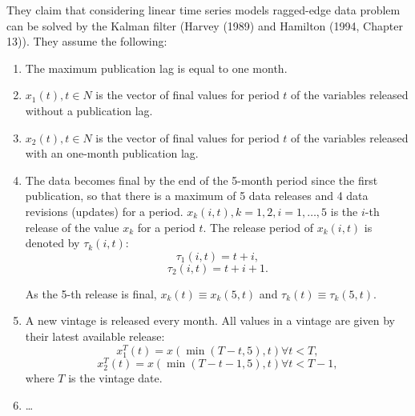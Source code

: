 \documentclass[8pt, a4paper, twocolumn, landscape]{extarticle}
\begin{document}
	They claim that considering linear time series models ragged-edge data problem can be solved by the Kalman filter (Harvey (1989) and Hamilton (1994, Chapter 13)). They assume the following:
	\begin{enumerate}
		\item The maximum publication lag is equal to one month.
		\item $x_1(t), t \in N$ is the vector of final values for period $t$ of the variables released without a publication lag.
		\item $x_2(t), t \in N$ is the vector of final values for period $t$ of the variables released with an one-month publication lag.
		\item The data becomes final by the end of the 5-month period since the first publication, so that there is a maximum of 5 data releases and 4 data revisions (updates) for a period. $x_k(i, t), k = 1, 2, i = 1, \dots, 5$ is the $i$-th release of the value $x_k$ for a period $t$. The release period of $x_k(i, t)$ is denoted by $\tau_k(i, t)$:
		\[
		\tau_1(i, t) = t + i,
		\]
		\[
		\tau_2(i, t) = t + i + 1.
		\]
		
		As the 5-th release is final, $x_k(t) \equiv x_k(5, t)$ and $\tau_k(t) \equiv \tau_k(5, t)$. 
		\item A new vintage is released every month. All values in a vintage are given by their latest available release:
		\[
		x_1^T(t) = x(\min(T-t, 5), t) \forall t < T,
		\]
		\[
		x_2^T(t) = x(\min(T-t-1, 5), t) \forall t < T-1,
		\]
		where $T$ is the vintage date.
		\item \dots
	\end{enumerate}

	
\end{document}
